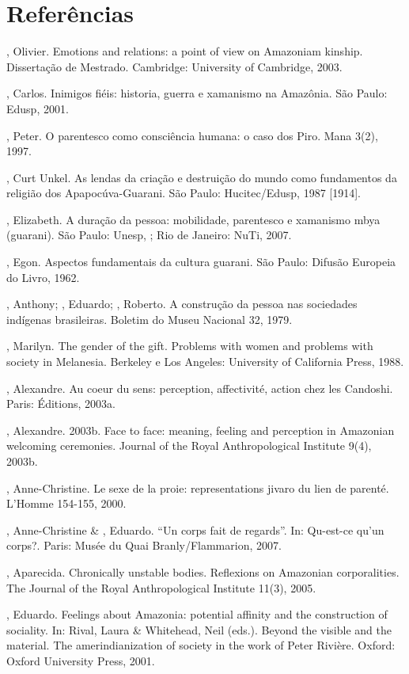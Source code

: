 \section{Referências}

\begin{Parskip}
, Olivier. Emotions and relations: a point of view on
Amazoniam kinship. Dissertação de Mestrado. Cambridge: University of
Cambridge, 2003.

, Carlos. Inimigos fiéis: historia, guerra e xamanismo na
Amazônia. São Paulo: Edusp, 2001.

, Peter. O parentesco como consciência humana: o caso dos Piro.
Mana 3(2), 1997.

, Curt Unkel. As lendas da criação e destruição do mundo
como fundamentos da religião dos Apapocúva-Guarani. São Paulo:
Hucitec/Edusp, 1987 [1914].

, Elizabeth. A duração da pessoa: mobilidade, parentesco
e xamanismo mbya (guarani). São Paulo: Unesp, ; Rio de Janeiro:
NuTi, 2007.

, Egon. Aspectos fundamentais da cultura guarani. São
Paulo: Difusão Europeia do Livro, 1962.

, Anthony;   , Eduardo;  , Roberto. A
construção da pessoa nas sociedades indígenas brasileiras. Boletim do
Museu Nacional 32, 1979.

, Marilyn. The gender of the gift. Problems with women
and problems with society in Melanesia. Berkeley e Los Angeles:
University of California Press, 1988.

, Alexandre. Au coeur du sens: perception, affectivité,
action chez les Candoshi. Paris:  Éditions, 2003a.

, Alexandre. 2003b. Face to face: meaning, feeling and
perception in Amazonian welcoming ceremonies. Journal of the Royal
Anthropological Institute 9(4), 2003b.

, Anne-Christine. Le sexe de la proie: representations
jivaro du lien de parenté. L’Homme 154-155, 2000.

, Anne-Christine \&   , Eduardo. ``Un corps
fait de regards''. In: Qu-est-ce qu’un corps?. Paris: Musée du Quai
Branly/Flammarion, 2007.

, Aparecida. Chronically unstable bodies. Reflexions on
Amazonian corporalities. The Journal of the Royal Anthropological
Institute 11(3), 2005.

  , Eduardo.  Feelings about Amazonia:
potential affinity and the construction of sociality. In: Rival, Laura
\& Whitehead, Neil (eds.). Beyond the visible and the material. The
amerindianization of society in the work of Peter Rivière. Oxford:
Oxford University Press, 2001.
\end{Parskip}

